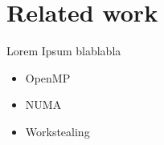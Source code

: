 \part{Related work}

Lorem Ipsum blablabla

\begin{itemize}
  \item OpenMP
  \item NUMA
  \item Workstealing
\end{itemize}



